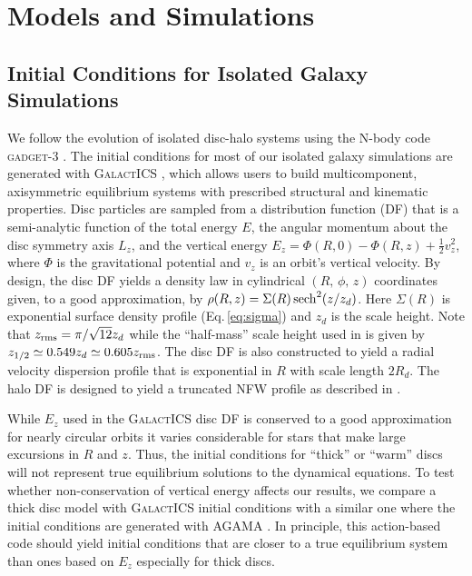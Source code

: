 \section{Models and Simulations} \label{sec:thick_discs_suppress}

\subsection{Initial Conditions for Isolated Galaxy Simulations}

We follow the evolution of isolated disc-halo systems using the N-body
code \textsc{gadget-3} \citep{GadgetCodePaper}.  The initial
conditions for most of our isolated galaxy simulations are generated
with \textsc{GalactICS} \citep{GalactICS1995,WPDGalactICSReference},
which allows users to build multicomponent, axisymmetric equilibrium
systems with prescribed structural and kinematic properties.  Disc
particles are sampled from a distribution function (DF) that is a
semi-analytic function of the total energy $E$, the angular momentum
about the disc symmetry axis $L_z$, and the vertical energy $E_z = \Phi(R,0) - \Phi(R,z) + \frac{1}{2} v_z^2$, where $\Phi$ is the gravitational potential and $v_z$ is an orbit's vertical velocity.  By
design, the disc DF yields a density law in cylindrical $\left
(R,\,\phi,\,z\right )$ coordinates given, to a good approximation, by
$\rho(R,z) = \Sigma(R)\,{\rm sech}^2(z/z_d)$.  Here $\Sigma(R)$ is
exponential surface density profile (Eq.\,\ref{eq:sigma}) and $z_d$ is
the scale height. Note that $z_{\rm rms} = \pi/\sqrt{12} z_d$ while the
``half-mass'' scale height used in \citet{YurinSpringelStellarDisks}
is given by $z_{1/2} \simeq 0.549z_d \simeq 0.605 z_{\rm rms}$.  The disc DF
is also constructed to yield a radial velocity dispersion profile that
is exponential in $R$ with scale length $2R_d$. The halo DF is
designed to yield a truncated NFW profile \citep{NFW} as described in
\citet{WPDGalactICSReference}.

While $E_z$ used in the \textsc{GalactICS} disc DF
is conserved to a good approximation for nearly circular orbits it
varies considerable for stars that make large excursions in $R$ and
$z$.  Thus, the initial conditions for ``thick'' or ``warm'' discs
will not represent true equilibrium solutions to the dynamical
equations.  To test whether non-conservation of vertical energy
affects our results, we compare a thick disc model with
\textsc{GalactICS} initial conditions with a similar one where the
initial conditions are generated with \textsc{AGAMA} \citep{agama}.
In principle, this action-based code should yield initial conditions
that are closer to a true equilibrium system than ones based on $E_z$
especially for thick discs.

